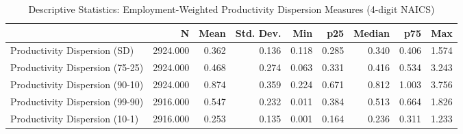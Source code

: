 \begin{table}
\caption{Descriptive Statistics: Employment-Weighted Productivity Dispersion Measures (4-digit NAICS)}
\label{tab:prod_dispersion_stats}
\begin{tabular}{lrrrrrrrr}
\toprule
 & N & Mean & Std. Dev. & Min & p25 & Median & p75 & Max \\
\midrule
Productivity Dispersion (SD) & 2924.000 & 0.362 & 0.136 & 0.118 & 0.285 & 0.340 & 0.406 & 1.574 \\
Productivity Dispersion (75-25) & 2924.000 & 0.468 & 0.274 & 0.063 & 0.331 & 0.416 & 0.534 & 3.243 \\
Productivity Dispersion (90-10) & 2924.000 & 0.874 & 0.359 & 0.224 & 0.671 & 0.812 & 1.003 & 3.756 \\
Productivity Dispersion (99-90) & 2916.000 & 0.547 & 0.232 & 0.011 & 0.384 & 0.513 & 0.664 & 1.826 \\
Productivity Dispersion (10-1) & 2916.000 & 0.253 & 0.135 & 0.001 & 0.164 & 0.236 & 0.311 & 1.233 \\
\bottomrule
\end{tabular}
\end{table}
